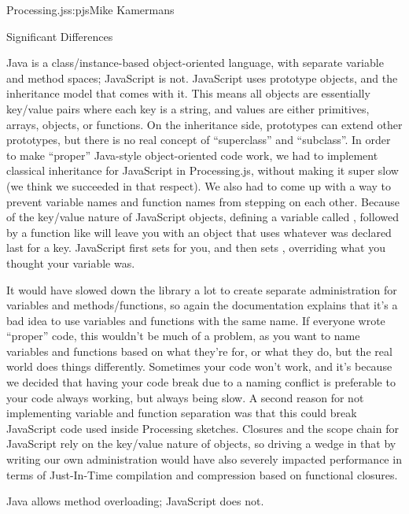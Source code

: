 \begin{aosachapter}{Processing.js}{s:pjs}{Mike Kamermans}
\begin{aosasect1}{Significant Differences}
\begin{aosasect3}{Java is a class/instance-based object-oriented language, with separate variable and method spaces; JavaScript is not.}
JavaScript uses prototype objects, and the inheritance model that
comes with it. This means all objects are essentially key/value pairs
where each key is a string, and values are either primitives, arrays,
objects, or functions. On the inheritance side, prototypes can extend
other prototypes, but there is no real concept of ``superclass'' and
``subclass''. In order to make ``proper'' Java-style object-oriented code
work, we had to implement classical inheritance for JavaScript in
Processing.js, without making it super slow (we think we succeeded in
that respect). We also had to come up with a way to prevent variable
names and function names from stepping on each other. Because of the
key/value nature of JavaScript objects, defining a variable called
, followed by a function like  will leave
you with an object that uses whatever was declared last for a
key. JavaScript first sets  for you, and
then sets , overriding what
you thought your variable  was.

It would have slowed down the library a lot to create separate
administration for variables and methods/functions, so again the
documentation explains that it's a bad idea to use variables and
functions with the same name. If everyone wrote ``proper'' code, this
wouldn't be much of a problem, as you want to name variables and
functions based on what they're for, or what they do, but the real
world does things differently. Sometimes your code won't work, and
it's because we decided that having your code break due to a naming
conflict is preferable to your code always working, but always being
slow. A second reason for not implementing variable and function
separation was that this could break JavaScript code used inside
Processing sketches. Closures and the scope chain for JavaScript rely
on the key/value nature of objects, so driving a wedge in that by
writing our own administration would have also severely impacted
performance in terms of Just-In-Time compilation and compression based
on functional closures.

\end{aosasect3}

\begin{aosasect3}{Java allows method overloading; JavaScript does not.}


\end{aosasect3}
\end{aosasect1}
\end{aosachapter}
